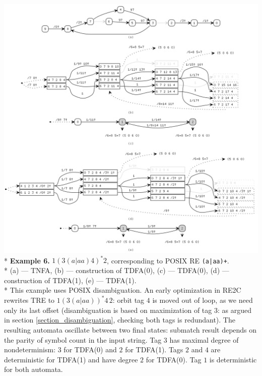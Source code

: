 \documentclass{article}
\theoremstyle{definition}
\begin{document}
\begin{center}
\includegraphics[width=\linewidth]{img/example4/all.png}\\*
\textbf{Example 6.} $1 (3 (a | aa) 4)^* 2$, corresponding to POSIX RE \texttt{(a|aa)+}.\\*\medskip
\small{
(a) --- TNFA, (b) --- construction of TDFA(0), (c) --- TDFA(0), (d) --- construction of TDFA(1), (e) --- TDFA(1).\\*\medskip
This example uses POSIX disambiguation.
An early optimization in RE2C rewrites TRE to $1 (3 (a | aa) )^* 4 \, 2$:
orbit tag $4$ is moved out of loop, as we need only its last offset
(disambiguation is based on maximization of tag $3$: as argued in section \ref{section_disambiguation}, checking both tags is redundant).
The resulting automata oscillate between two final states:
submatch result depends on the parity of symbol count in the input string.
Tag $3$ has maximal degree of nondeterminism: $3$ for TDFA(0) and $2$ for TDFA(1).
Tags $2$ and $4$ are deterministic for TDFA(1) and have degree $2$ for TDFA(0).
Tag $1$ is deterministic for both automata.
}\\[1em]
\end{center}

\bigskip
\end{document}
